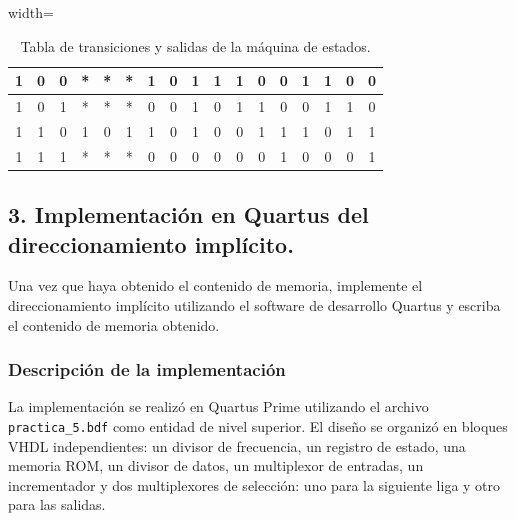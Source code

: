 \documentclass[12pt, letterpaper]{article}
\begin{document}
\begin{table}[H]
\begin{center}
\begin{adjustbox}{width=\textwidth}
\begin{tabular}{|ccc|cc|c|ccc|cccc|cccc|}
    \hline
    1 & 0 & 0 & * & * & * & 1 & 0 & 1 & \cellcolor{ForestGreen!90}1 & \cellcolor{ForestGreen!90}1 & \cellcolor{ForestGreen!90}0 & \cellcolor{ForestGreen!90}0 & \cellcolor{LimeGreen}1 & \cellcolor{LimeGreen}1 & \cellcolor{LimeGreen}0 & \cellcolor{LimeGreen}0 \\
    \hline
    1 & 0 & 1 & * & * & * & 0 & 0 & 1 & \cellcolor{ForestGreen!90}0 & \cellcolor{ForestGreen!90}1 & \cellcolor{ForestGreen!90}1 & \cellcolor{ForestGreen!90}0 & \cellcolor{LimeGreen}0 & \cellcolor{LimeGreen}1 & \cellcolor{LimeGreen}1 & \cellcolor{LimeGreen}0 \\
    \hline
    1 & 1 & 0 & 1 & 0 & 1 & 1 & 0 & 1 & \cellcolor{ForestGreen!90}0 & \cellcolor{ForestGreen!90}0 & \cellcolor{ForestGreen!90}1 & \cellcolor{ForestGreen!90}1 & \cellcolor{LimeGreen}1 & \cellcolor{LimeGreen}0 & \cellcolor{LimeGreen}1 & \cellcolor{LimeGreen}1 \\
    \hline
    1 & 1 & 1 & * & * & * & 0 & 0 & 0 & \cellcolor{ForestGreen!90}0 & \cellcolor{ForestGreen!90}0 & \cellcolor{ForestGreen!90}0 & \cellcolor{ForestGreen!90}1 & \cellcolor{LimeGreen}0 & \cellcolor{LimeGreen}0 & \cellcolor{LimeGreen}0 & \cellcolor{LimeGreen}1 \\
    \hline
    \end{tabular}
    \end{adjustbox}
\end{center}
\caption{Tabla de transiciones y salidas de la máquina de estados.}
\label{tab:tabla_transiciones_estados_salidas_1}
\end{table}


\subsection*{3. Implementación en Quartus del direccionamiento implícito.}

Una vez que haya obtenido el contenido de memoria, implemente el direccionamiento implícito utilizando el software de desarrollo Quartus y escriba el contenido de memoria obtenido.

\subsubsection*{Descripción de la implementación}

La implementación se realizó en Quartus Prime utilizando el archivo
\texttt{practica\_5.bdf} como entidad de nivel superior. El diseño se organizó
en bloques VHDL independientes: un divisor de frecuencia, un registro de
estado, una memoria ROM, un divisor de datos, un multiplexor de entradas, un
incrementador y dos multiplexores de selección: uno para la siguiente liga y
otro para las salidas.
\end{document}
